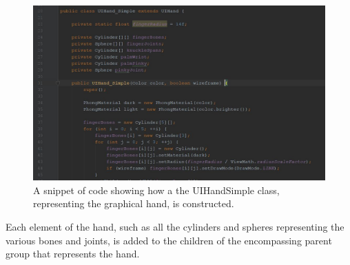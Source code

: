 \begin{figure}[th]
\centering
\includegraphics[scale=0.5]{Figures/uihand_simple_constructor.JPG}
\caption[UIHandSimple Constructor]{A snippet of code showing how a the UIHandSimple class, representing the graphical hand, is constructed. }
\label{fig:uihandsimpleConst}
\end{figure}


Each element of the hand, such as all the cylinders and spheres representing the various bones and joints, is added to the children of the encompassing parent group that represents the hand.



